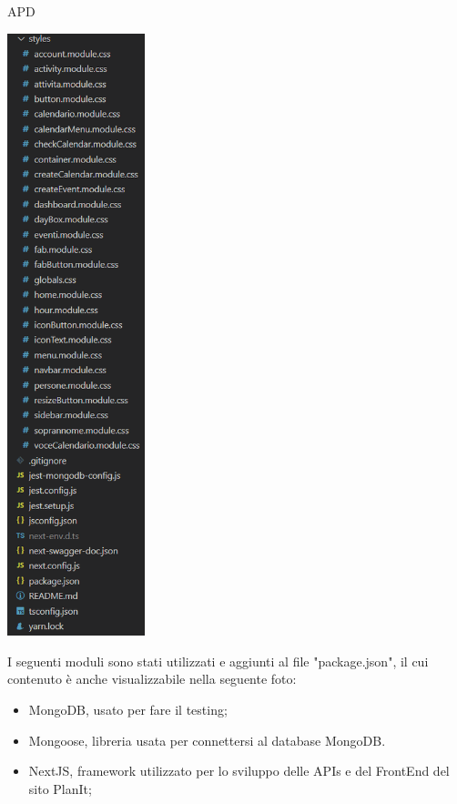 \begin{listaPersonale} {APD}
\begin{center}
        \includegraphics[width=0.3\textwidth, height=0.75\textheight]{img/png/project_structure/project_structure_totale_2.png}
    \end{center}
    \newpage
    I seguenti moduli sono stati utilizzati e aggiunti al file "package.json", il cui contenuto è anche visualizzabile nella seguente foto:
    \begin{itemize}
        \item MongoDB, usato per fare il testing;
        \item Mongoose, libreria usata per connettersi al database MongoDB.
        \item NextJS, framework utilizzato per lo sviluppo delle APIs e del FrontEnd del sito PlanIt;

\end{itemize}
\end{listaPersonale}
